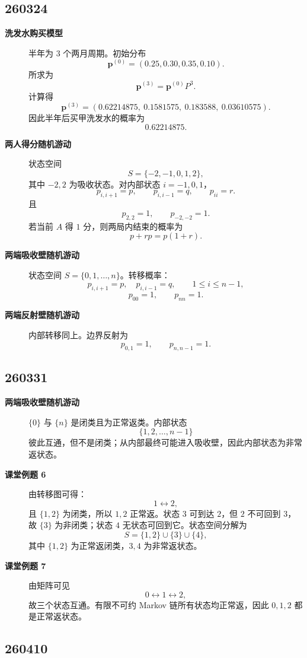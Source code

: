 \documentclass[12pt,a4paper,openany]{ctexrep}
\theoremstyle{definition}
\begin{document}
\subsection*{260324}

\begin{description}
	\item[\textbf{洗发水购买模型}]
	半年为 $3$ 个两月周期。初始分布
	\[
	\bm p^{(0)}=(0.25,0.30,0.35,0.10).
	\]
	所求为
	\[
	\bm p^{(3)}=\bm p^{(0)}P^3.
	\]
	计算得
	\[
	\bm p^{(3)}
	=(0.62214875,\ 0.1581575,\ 0.183588,\ 0.03610575).
	\]
	因此半年后买甲洗发水的概率为
	\[
	0.62214875.
	\]
	\item[\textbf{两人得分随机游动}]
	状态空间
	\[
	S=\{-2,-1,0,1,2\},
	\]
	其中 $-2,2$ 为吸收状态。对内部状态 $i=-1,0,1$，
	\[
	p_{i,i+1}=p,\qquad p_{i,i-1}=q,\qquad p_{ii}=r.
	\]
	且
	\[
	p_{2,2}=1,\qquad p_{-2,-2}=1.
	\]
	若当前 $A$ 得 $1$ 分，则两局内结束的概率为
	\[
	p+rp=p(1+r).
	\]
	\item[\textbf{两端吸收壁随机游动}]
	状态空间 $S=\{0,1,\dots,n\}$。转移概率：
	\[
	p_{i,i+1}=p,\quad p_{i,i-1}=q,\qquad 1\le i\le n-1,
	\]
	\[
	p_{00}=1,\qquad p_{nn}=1.
	\]
	\item[\textbf{两端反射壁随机游动}]
	内部转移同上。边界反射为
	\[
	p_{0,1}=1,\qquad p_{n,n-1}=1.
	\]
\end{description}

\subsection*{260331}

\begin{description}
	\item[\textbf{两端吸收壁随机游动}]
	$\{0\}$ 与 $\{n\}$ 是闭类且为正常返类。内部状态
	\[
	\{1,2,\dots,n-1\}
	\]
	彼此互通，但不是闭类；从内部最终可能进入吸收壁，因此内部状态为非常返状态。
	\item[\textbf{课堂例题 6}]
	由转移图可得：
	\[
	1\leftrightarrow 2,
	\]
	且 $\{1,2\}$ 为闭类，所以 $1,2$ 正常返。状态 $3$ 可到达 $2$，但 $2$ 不可回到 $3$，故 $\{3\}$ 为非闭类；状态 $4$ 无状态可回到它。状态空间分解为
	\[
	S=\{1,2\}\cup\{3\}\cup\{4\},
	\]
	其中 $\{1,2\}$ 为正常返闭类，$3,4$ 为非常返状态。
	\item[\textbf{课堂例题 7}]
	由矩阵可见
	\[
	0\leftrightarrow1\leftrightarrow2,
	\]
	故三个状态互通。有限不可约 Markov 链所有状态均正常返，因此 $0,1,2$ 都是正常返状态。
\end{description}

\subsection*{260410}
\end{document}
